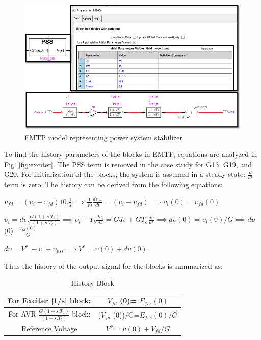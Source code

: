 \documentclass{report}
\begin{document}
\begin{figure}
    \centering
    \includegraphics[width=1.0\linewidth]{Figure_Nordic/PSSEMTP.png}
    \caption{EMTP model representing power system stabilizer}
    \label{fig:PSSEMTP}
\end{figure}

To find the history parameters of the blocks in EMTP, equations are analyzed in Fig. \ref{fig:exciter}. The PSS term is removed in the case study for G13, G19, and G20. For initialization of the blocks, the system is assumed in a steady state: $\frac{d}{dt}$ term is zero.  The history can be derived from the following equations: 

$\upsilon_{fd}=(\upsilon_i-\upsilon_{fd})10.\frac{1}{s} \implies \frac{1}{10}\frac{d\upsilon_{fd}}{dt} = (\upsilon_i-\upsilon_{fd}) \implies \upsilon_i(0)=\upsilon_{fd}(0)  $

$ \upsilon_i = d\upsilon.\frac{G(1+s.T_a)}{(1+s.T_b)} \implies \upsilon_i +T_b\frac{d\upsilon_i}{dt} = Gd\upsilon + GT_a\frac{d\upsilon}{dt} \implies d\upsilon(0)=\upsilon_i(0)/G \implies d\upsilon$(0)=$\frac{v_{fd}(0)}{G}$

$d\upsilon=V^o\ -\upsilon\ +\upsilon_{pss} \implies V^o=\upsilon(0)+d\upsilon(0)$.

 Thus the history of the output signal for the blocks is summarized as:
 \begin{table}[H]
\centering
\caption{History Block}
\begin{tabular}{|c|c|}
    \hline
For Exciter [1/s] block: & $V_{fd}$ (0)= $E_{fss}(0) $ \\
\hline
For AVR $\frac{G(1+s.T_a )}{(1+s.T_b)}$ block: &($V_{fd}$ (0))/G=$E_{fss}(0)/G$\\
\hline
Reference Voltage &$V^o=\upsilon(0)+V_{fd}/G$ \\
    \hline
\end{tabular}
\label{tab:HistoryExciter}
\end{table}
\end{document}
